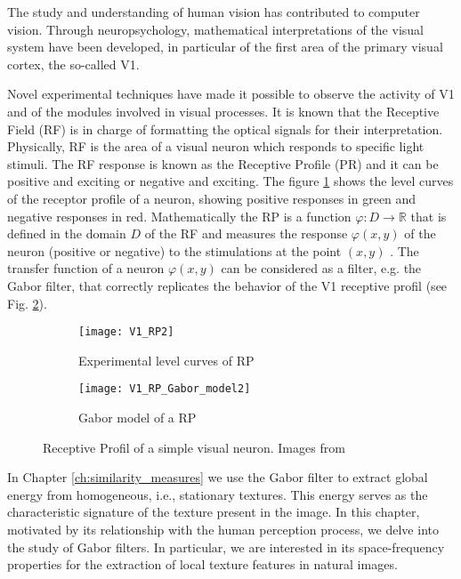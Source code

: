 The study and understanding of human vision has contributed to computer vision. Through neuropsychology, mathematical interpretations of the visual system have been developed, in particular of the first area of the primary visual cortex, the so-called V1.

Novel experimental techniques \citep{DeAngelis.Ohzawa.ea:TN:1995} have made it possible to observe the activity of V1 and of the modules involved in visual processes. It is known that the Receptive Field (RF) is in charge of formatting the optical signals for their interpretation. Physically, RF is the area of a visual neuron which responds to specific light stimuli. The RF response is known as the Receptive Profile (PR) and it can be positive and exciting or negative and exciting. The figure \ref{fig:V1_RP} shows the level curves of the receptor profile of a neuron, showing positive responses in green and negative responses in red.
Mathematically the RP is a function $\varphi:  D \rightarrow \mathbb{R}$ that is defined in the domain $D$ of the RF and measures the response $\varphi(x,y)$ of the neuron (positive or negative) to the stimulations at the point $(x,y)$ \citep{Petitot:Neurogeometrie:2008}.
The transfer function of a neuron $\varphi(x,y)$ can be considered as a filter, e.g. the Gabor filter, that correctly replicates the behavior of the V1 receptive profil (see Fig. \ref{fig:V1_RP_Gabor}).

\begin{figure}[!ht] 
	\centering
	\begin{subfigure}[b]{0.4\textwidth}
		\centering
		\texttt{[image: V1\_RP2]}
		\caption{Experimental level curves of RP}	
		\label{fig:V1_RP}
	\end{subfigure}
	\qquad %
	\begin{subfigure}[b]{0.4\textwidth}
		\centering
		\texttt{[image: V1\_RP\_Gabor\_model2]}
		\caption{Gabor model of a RP }	
		\label{fig:V1_RP_Gabor}
	\end{subfigure}

  \caption{Receptive Profil of a simple visual neuron. Images from \citep{Petitot:Neurogeometrie:2008}}
  \label{fig:simple_neuron_receptive_profil}
\end{figure}

In Chapter \ref{ch:similarity_measures} we use the Gabor filter to extract global energy from homogeneous, i.e., stationary textures. This energy serves as the characteristic signature of the texture present in the image. In this chapter, motivated by its relationship with the human perception process, we delve into the study of Gabor filters. In particular, we are interested in its space-frequency properties for the extraction of local texture features in natural images.

